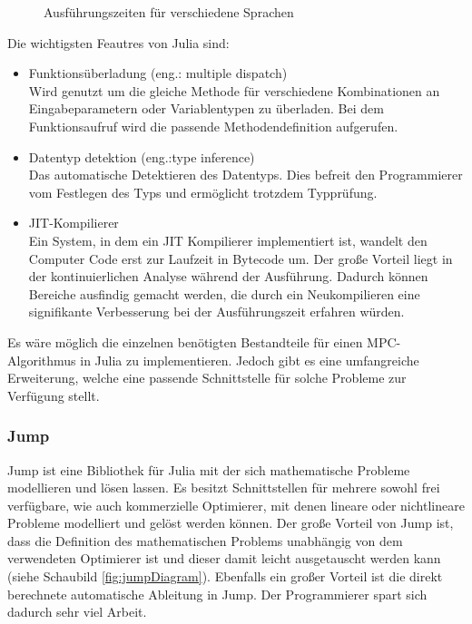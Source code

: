 \documentclass{like}
\begin{document}
\begin{figure}[ht!]
	\centering
	 
	\caption{Ausführungszeiten für verschiedene Sprachen}
	\label{fig:juliaBench}
\end{figure}

Die wichtigsten Feautres von Julia sind:

\begin{itemize}
	
	\item Funktionsüberladung (eng.: multiple dispatch)\\Wird genutzt um die gleiche Methode für verschiedene Kombinationen an Ein\-ga\-be\-pa\-ra\-me\-tern oder Variablentypen zu überladen. Bei dem Funktionsaufruf wird die passende Methodendefinition aufgerufen. \\
	\item Datentyp detektion (eng.:type inference) \\Das automatische Detektieren des Datentyps. Dies befreit den Programmierer vom Festlegen des Typs und ermöglicht trotzdem Typprüfung. \\
	\item \ac{JIT}-Kompilierer\\ Ein System, in dem ein \ac{JIT} Kompilierer implementiert ist, wandelt den Computer Code erst zur Laufzeit in Bytecode um. 
	Der große Vorteil liegt in der kontinuierlichen Analyse während der Ausführung. Dadurch können Bereiche ausfindig gemacht werden, die durch ein Neukompilieren eine signifikante Verbesserung bei der Aus\-führ\-ungs\-zeit erfahren würden. \\
\end{itemize}
Es wäre möglich die einzelnen benötigten Bestandteile für einen \ac{MPC}-Algorithmus in Julia zu implementieren. Jedoch gibt es eine umfangreiche Erweiterung, welche eine passende Schnittstelle für solche Probleme zur Verfügung stellt.

\subsubsection*{Jump}
\ac{Jump} ist eine Bibliothek für Julia mit der sich mathematische Probleme modellieren und lösen lassen. Es besitzt Schnittstellen für mehrere sowohl frei verfügbare, wie auch kommerzielle Optimierer, mit denen lineare oder nichtlineare Probleme modelliert und gelöst werden können. Der große Vorteil von \ac{Jump} ist, dass die Definition des mathematischen Problems unabhängig von dem verwendeten Optimierer ist und dieser damit leicht ausgetauscht werden kann (siehe Schaubild \ref{fig:jumpDiagram}). Ebenfalls ein großer Vorteil ist die direkt berechnete automatische Ableitung in \ac{Jump}. Der Programmierer spart sich dadurch sehr viel Arbeit.
\end{document}
